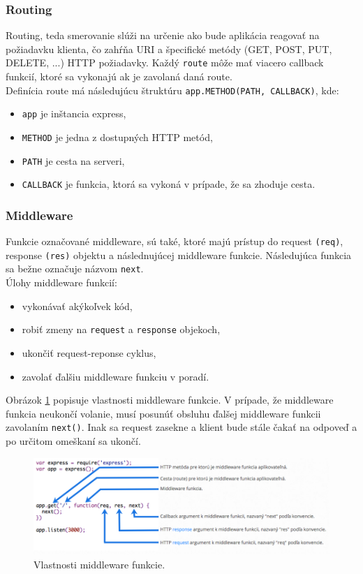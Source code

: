 \subsubsection{Routing}
Routing, teda smerovanie slúži na určenie ako bude aplikácia reagovať na požiadavku klienta, čo zahŕňa URI a špecifické metódy (GET, POST, PUT, DELETE, ...) HTTP požiadavky.\cite{express-tutorial}
Každý \verb|route| môže mať viacero callback funkcií, ktoré sa vykonajú ak je zavolaná daná route.\\

\noindent Definícia route má následujúcu štruktúru \verb|app.METHOD(PATH, CALLBACK)|, kde:
\begin{itemize}
\item \verb|app| je inštancia express,
\item \verb|METHOD| je jedna z dostupných HTTP metód,
\item \verb|PATH| je cesta na serveri,
\item \verb|CALLBACK| je funkcia, ktorá sa vykoná v prípade, že sa zhoduje cesta.\cite{express-routing}
\end{itemize}

\subsubsection{Middleware}
Funkcie označované middleware, sú také, ktoré majú prístup do request \verb|(req)|, response \verb|(res)| objektu a následnujúcej middleware funkcie. Následujúca funkcia sa bežne označuje názvom \verb|next|.\cite{express-middleware} \\

\noindent Úlohy middleware funkcií:
\begin{itemize}
\item vykonávať akýkoľvek kód,
\item robiť zmeny na \verb|request| a \verb|response| objekoch,
\item ukončiť request-reponse cyklus,
\item zavolať ďalšiu middleware funkciu v poradí. 
\end{itemize}

Obrázok \ref{img-express-middleware} popisuje vlastnosti middleware funkcie. V prípade, že middleware funkcia neukončí volanie, musí posunúť obsluhu ďalšej middleware funkcii zavolaním \verb|next()|. Inak sa request zasekne a klient bude stále čakať na odpoveď a po určitom omeškaní sa ukončí.\cite{express-middleware}

\begin{figure}[H]
  \centering
  \includegraphics[scale=0.5]{img/express/express-middleware.png}
  \caption{Vlastnosti middleware funkcie.\cite{express-middleware}}
  \label{img-express-middleware}
\end{figure}

